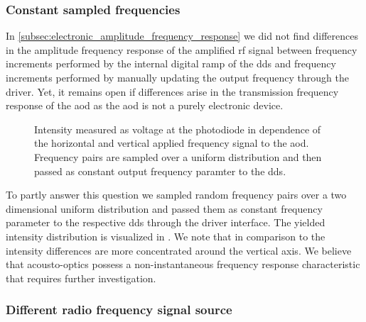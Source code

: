 \subsubsection{Constant sampled frequencies}

In \cref{subsec:electronic_amplitude_frequency_response} we did not find
differences in the amplitude frequency response of the amplified \gls{rf}
signal between frequency increments performed by the internal digital ramp of
the \gls{dds} and frequency increments performed by manually updating the
output frequency through the driver. Yet, it remains open if differences
arise in the transmission frequency response of the \gls{aod} as the \gls{aod}
is not a purely electronic device.
\begin{figure}[htb]
  \centering
  \begin{adjustbox}{width=\textwidth}
  \end{adjustbox}
  \caption{Intensity measured as voltage at the photodiode in dependence of
    the horizontal and vertical applied frequency signal to the \gls{aod}.
    Frequency pairs are sampled over a uniform distribution and then passed
    as constant output frequency paramter to the \gls{dds}.
  }\label{fig:intensity_distribution_frequency_sampled}
\end{figure}
To partly answer this question we sampled random frequency pairs over a
two dimensional uniform distribution and passed them as constant frequency
parameter to the respective \gls{dds} through the driver interface. The
yielded intensity distribution is visualized in
. We note that in
comparison to  the intensity
differences are more concentrated around the vertical axis. We believe that
acousto-optics possess a non-instantaneous frequency response characteristic
that requires further investigation.

\subsubsection{Different radio frequency signal source}

